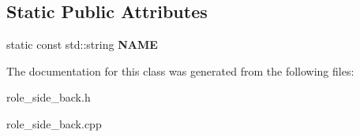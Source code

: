 \subsection*{Static Public Attributes}
\begin{DoxyCompactItemize}
\item 
\hypertarget{classRoleSideBack_ac3e0af10253bbba0b8a17cabf103ed66}{
static const std::string {\bfseries NAME}}
\label{classRoleSideBack_ac3e0af10253bbba0b8a17cabf103ed66}

\end{DoxyCompactItemize}


The documentation for this class was generated from the following files:\begin{DoxyCompactItemize}
\item 
role\_\-side\_\-back.h\item 
role\_\-side\_\-back.cpp\end{DoxyCompactItemize}
